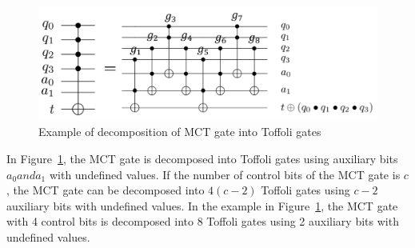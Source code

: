 \begin{figure}[tbp]
\centering
\includegraphics[width=13cm]{img/barenco.pdf}
\caption{Example of decomposition of MCT gate into Toffoli gates}
\label{barenco}
\end{figure}
In Figure~\ref{barenco}, the MCT gate is decomposed into Toffoli gates using auxiliary bits $a_{0} and a_{1}$ with undefined values.
If the number of control bits of the MCT gate is $c$, the MCT gate can be decomposed into $4(c-2)$ Toffoli gates using $c-2$ auxiliary bits with undefined values\cite{barenco1995elementary}.
In the example in Figure~\ref{barenco}, the MCT gate with 4 control bits is decomposed into 8 Toffoli gates using 2 auxiliary bits with undefined values.
